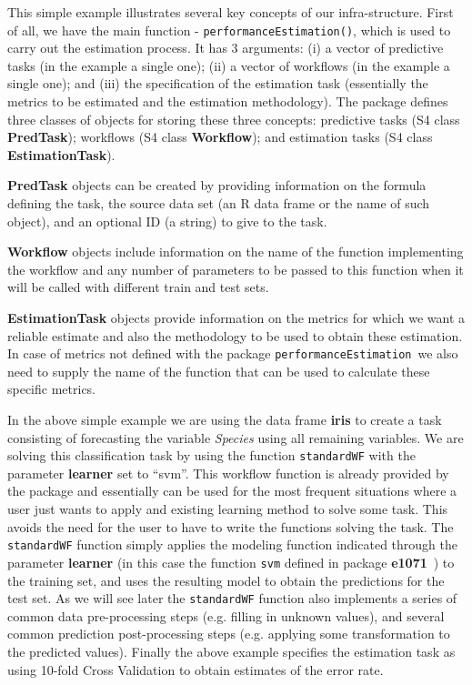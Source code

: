 \documentclass[10pt,a4paper]{article}\usepackage[]{graphicx}\usepackage[]{color}
\newcommand{\PE}{package \texttt{performanceEstimation}\ }
\begin{document}
This simple example illustrates several key concepts of our
infra-structure. First of all, we have the main function  -
\texttt{performanceEstimation()}, which is used to carry out
the estimation process. It has 3 arguments: (i) a vector of
predictive tasks (in the example a single one); (ii) a vector of workflows (in the example a single one); and (iii) the
specification of the estimation task (essentially the metrics to be estimated and the estimation methodology). The package defines three classes of objects for storing these three concepts: predictive tasks (S4 class \textbf{PredTask}); workflows (S4 class \textbf{Workflow}); and estimation tasks (S4 class \textbf{EstimationTask}).

\textbf{PredTask} objects can be created by providing information on the formula defining the task, the source data set (an R data frame or the name of such object), and an optional ID (a string) to give to the task.

\textbf{Workflow} objects include information on the name of the function implementing the workflow and any number of parameters to be passed to this function when it will be called with different train and test sets.

\textbf{EstimationTask} objects provide information on the metrics for which we want a reliable estimate and also the methodology to be used to obtain these estimation. In case of metrics not defined with the \PE we also need to supply the name of the function that can be used to calculate these specific metrics.

In the above simple example we are using the data frame \textbf{iris} to create a task consisting of forecasting the variable \textit{Species} using all remaining variables. We are solving this classification task by using the function \texttt{standardWF} with the parameter \textbf{learner} set to ``svm''. This workflow function is already provided by the package and essentially can be used for the most frequent situations where a user just wants to apply and existing learning method to solve some task. This avoids the need for the user to have to write the functions solving the task. The \texttt{standardWF} function simply applies the modeling function indicated through the parameter \textbf{learner} (in this case the function \texttt{svm} defined in package \textbf{e1071}~\cite{e1071}) to the training set, and uses the resulting model to obtain the predictions for the test set. As we will see later the \texttt{standardWF} function also implements a series of common data pre-processing steps (e.g. filling in unknown values), and several common prediction post-processing steps (e.g. applying some transformation to the predicted values). Finally the above example specifies the estimation task as using 10-fold Cross Validation to obtain estimates of the error rate. 
\end{document}
